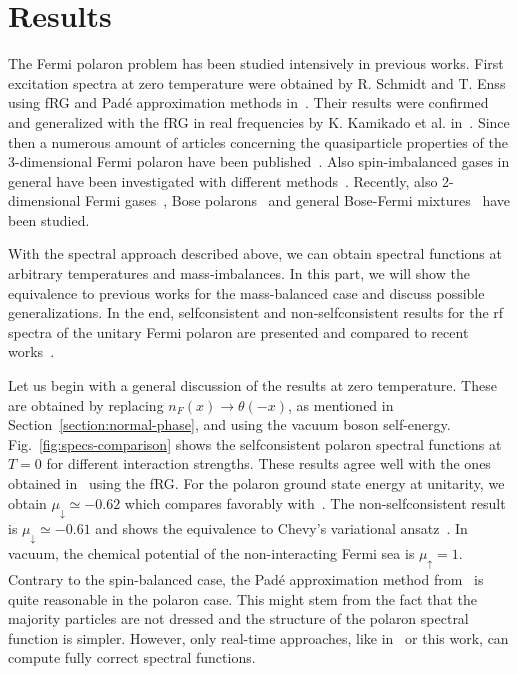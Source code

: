 \section{Results}
\label{section:polaron-results}

The Fermi polaron problem has been studied intensively in previous works. First excitation spectra at zero temperature were obtained by R. Schmidt and T. Enss using fRG and Padé approximation methods in~\cite{Schmidt2011}. Their results were confirmed and generalized with the fRG in real frequencies by K. Kamikado et al. in~\cite{Kamikado2017}. Since then a numerous amount of articles concerning the quasiparticle properties of the 3-dimensional Fermi polaron have been published~\cite{Mulkerin2019,Scazza2022,Veillette2008,Vlietinck2013}. Also spin-imbalanced gases in general have been investigated with different methods~\cite{Chevy2006,Prokofev2008,VanHoucke2020,Veillette2008}. Recently, also 2-dimensional Fermi gases~\cite{Schmidt2012,Bauer2014,Mulkerin2015}, Bose polarons~\cite{Tajima2021} and general Bose-Fermi mixtures~\cite{Milczewski2022} have been studied.

With the spectral approach described above, we can obtain spectral functions at arbitrary temperatures and mass-imbalances. In this part, we will show the equivalence to previous works for the mass-balanced case and discuss possible generalizations. In the end, selfconsistent and non-selfconsistent results for the rf spectra of the unitary Fermi polaron are presented and compared to recent works~\cite{Tajima2019,Hu2008,Yan2019}. 

Let us begin with a general discussion of the results at zero temperature. These are obtained by replacing $n_F(x)\rightarrow\theta(-x)$, as mentioned in Section~\ref{section:normal-phase}, and using the vacuum boson self-energy. Fig.~\ref{fig:specs-comparison} shows the selfconsistent polaron spectral functions at $T=0$ for different interaction strengths. These results agree well with the ones obtained in~\cite{Schmidt2011,Kamikado2017} using the fRG. For the polaron ground state energy at unitarity, we obtain $\mu_{\downarrow}\simeq-0.62$ which compares favorably with~\cite{Combescot2008}. The non-selfconsistent result is $\mu_{\downarrow}\simeq-0.61$ and shows the equivalence to Chevy's variational  ansatz~\cite{Chevy2006,Combescot2007}. In vacuum, the chemical potential of the non-interacting Fermi sea is $\mu_{\uparrow}=1$. Contrary to the spin-balanced case, the Padé approximation method from~\cite{Schmidt2011} is quite reasonable in the polaron case. This might stem from the fact that the majority particles are not dressed and the structure of the polaron spectral function is simpler. However, only real-time approaches, like in~\cite{Kamikado2017} or this work, can compute fully correct spectral functions.

